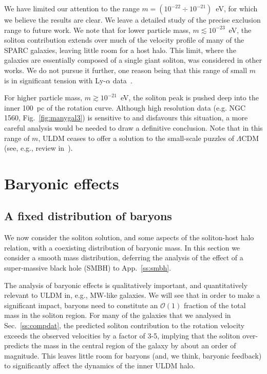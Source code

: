 \documentclass[aps,prd,floats,superscriptaddress,showpacs,nofootinbib,twocolumn,preprintnumbers]{revtex4-1}%
\begin{document}
We have limited our attention to the range $m=(10^{-22}\div
10^{-21})$~eV, for which we believe the results are clear. We leave a
detailed study of the precise exclusion range to future work. We note
that for lower particle mass, $m\lesssim10^{-23}$~eV, the soliton
contribution extends over much of the velocity profile of many of the
SPARC galaxies, leaving little room for a host halo. This limit, where
the galaxies are essentially composed of a single giant soliton, was
considered in other works. We do not pursue it further, one reason
being that this range of small $m$ is in significant tension with
Ly-$\alpha$ data~\cite{Armengaud:2017nkf,Bozek:2014uqa}.  

For higher particle mass, $m\gtrsim10^{-21}$~eV, the soliton peak is
pushed deep into the inner 100~pc of the rotation curve. Although high
resolution data (e.g. NGC 1560,
Fig.~\ref{fig:manygal3}) is sensitive to and disfavours this
situation, a more careful analysis would be needed to draw a
definitive conclusion.
Note that in this range of $m$, ULDM ceases to offer a solution to the
small-scale puzzles of $\Lambda$CDM (see, e.g., review
in~\cite{Hui:2016ltb}).  




\section{Baryonic effects}\label{s:bareff}
%

\subsection{A fixed distribution of baryons}\label{s:fixbar}
We now consider the soliton solution, and some aspects of the
soliton-host halo relation, with a coexisting distribution of baryonic
mass. In this section we consider a smooth mass distribution,
deferring the analysis of the effect of a super-massive black hole
(SMBH) to App.~\ref{ss:smbh}. 

The analysis of baryonic effects is qualitatively important, and
quantitatively relevant to ULDM in, e.g., MW-like galaxies. 
We will see that in order to make a significant impact, baryons need to constitute an
$\mathcal{O}(1)$ fraction of the total mass in the soliton
region. For many of the galaxies that we analysed in Sec.~\ref{ss:compdat}, the predicted soliton contribution to the rotation 
velocity exceeds the
observed velocities by a factor of 3-5, implying that the soliton
over-predicts the mass in the central region of the galaxy by about an
order of magnitude. 
%
This leaves little room for baryons (and, we think, baryonic feedback) to significantly affect the dynamics of the inner ULDM halo. 
%
\end{document}

